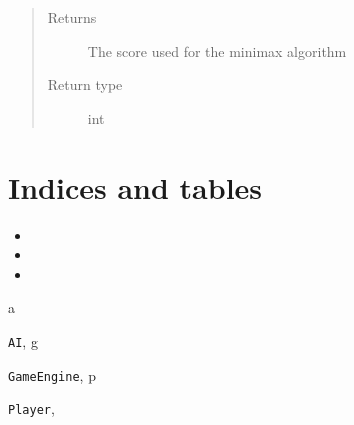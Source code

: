 \documentclass[letterpaper,10pt,english]{sphinxmanual}
\begin{document}
\begin{fulllineitems}
\begin{fulllineitems}
\begin{quote}
\begin{description}
\item[{Returns}] \leavevmode
The score used for the minimax algorithm

\item[{Return type}] \leavevmode
int

\end{description}\end{quote}

\end{fulllineitems}


\end{fulllineitems}



\chapter{Indices and tables}
\label{index:welcome-to-tictactoe-ge-s-documentation}\label{index:indices-and-tables}\begin{itemize}
\item {} 

\item {} 

\item {} 

\end{itemize}


\renewcommand{\indexname}{Python Module Index}
\begin{theindex}
\def\bigletter#1{{\Large\sffamily#1}\nopagebreak\vspace{1mm}}
\bigletter{a}
\item {\texttt{AI}}, \pageref{index:module-AI}
\indexspace
\bigletter{g}
\item {\texttt{GameEngine}}, \pageref{index:module-GameEngine}
\indexspace
\bigletter{p}
\item {\texttt{Player}}, \pageref{index:module-Player}
\end{theindex}

\renewcommand{\indexname}{Index}
\printindex
\end{document}
